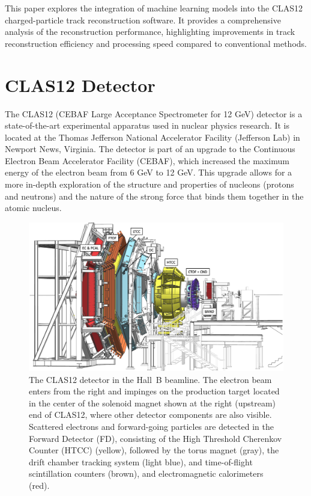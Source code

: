 \documentclass{webofc}
\begin{document}
This paper explores the integration of machine learning models into the CLAS12 charged-particle track reconstruction software. It provides a comprehensive analysis of the reconstruction performance, highlighting improvements in track reconstruction efficiency and processing speed compared to conventional methods.


\section{CLAS12 Detector}

The CLAS12 (CEBAF Large Acceptance Spectrometer for 12 GeV) detector is a state-of-the-art experimental apparatus used in nuclear physics research. It is located at the Thomas Jefferson National Accelerator Facility (Jefferson Lab) in Newport News, Virginia. The detector is part of an upgrade to the Continuous Electron Beam Accelerator Facility (CEBAF), which increased the maximum energy of the electron beam from 6 GeV to 12 GeV. This upgrade allows for a more in-depth exploration of the structure and properties of nucleons (protons and neutrons) and the nature of the strong force that binds them together in the atomic nucleus.

\begin{figure}[h!]
\centering
\centerline{\includegraphics[width=0.7\columnwidth]{images/CLAS12-side.png}}
\caption{The CLAS12 detector in the Hall~B beamline. The electron beam enters from the right and impinges on
  the production target located in the center of the solenoid magnet shown at the right (upstream) end of CLAS12,
  where other detector components are also visible. Scattered electrons and forward-going particles are detected
  in the Forward Detector (FD), consisting of the High Threshold Cherenkov Counter (HTCC) (yellow), 
  followed by the torus magnet (gray), the drift chamber tracking system (light blue),
  and time-of-flight scintillation counters (brown), and electromagnetic calorimeters (red). } 
\label{fig:CLAS12}
\end{figure}
\end{document}
